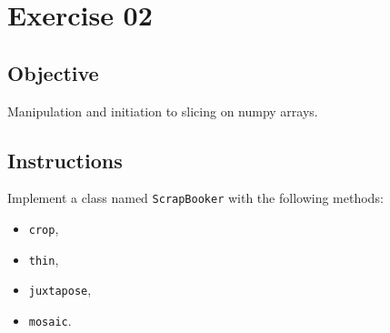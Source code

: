 \chapter{Exercise 02}
\makeheaderfilesforbidden

\section*{Objective}
Manipulation and initiation to slicing on numpy arrays.

\section*{Instructions}
Implement a class named \texttt{ScrapBooker} with the following methods:
\begin{itemize}
  \item \texttt{crop},
  \item \texttt{thin},
  \item \texttt{juxtapose},
  \item \texttt{mosaic}.
\end{itemize}

